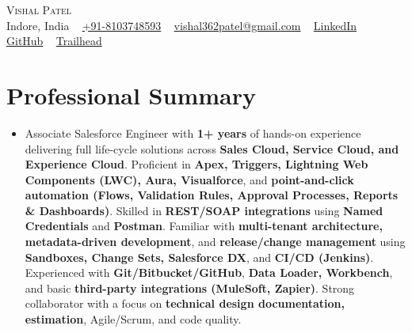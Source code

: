 \documentclass[letterpaper,10pt]{article}
\begin{document}
\begin{center}
    {\LARGE \scshape Vishal Patel} \\ \vspace{1pt}
    Indore, India ~
    \href{tel:+918103748593}{+91-8103748593} ~
    \href{mailto:vishal362patel@gmail.com}{vishal362patel@gmail.com} ~
    \href{https://www.linkedin.com/in/vishalpatel362}{LinkedIn} ~
    \href{https://github.com/vishal362patel}{GitHub} ~
    \href{https://trailblazer.me/id/vishal362patel}{Trailhead}
\end{center}

\section{Professional Summary}
\begin{itemize}[leftmargin=0.15in,label={},topsep=0pt,noitemsep]
    \item Associate Salesforce Engineer with \textbf{1+ years} of hands-on experience delivering full life-cycle solutions across \textbf{Sales Cloud, Service Cloud, and Experience Cloud}. Proficient in \textbf{Apex, Triggers, Lightning Web Components (LWC), Aura, Visualforce}, and \textbf{point-and-click automation (Flows, Validation Rules, Approval Processes, Reports \& Dashboards)}. Skilled in \textbf{REST/SOAP integrations} using \textbf{Named Credentials} and \textbf{Postman}. Familiar with \textbf{multi-tenant architecture, metadata-driven development}, and \textbf{release/change management} using \textbf{Sandboxes, Change Sets, Salesforce DX}, and \textbf{CI/CD (Jenkins)}. Experienced with \textbf{Git/Bitbucket/GitHub}, \textbf{Data Loader, Workbench}, and basic \textbf{third-party integrations (MuleSoft, Zapier)}. Strong collaborator with a focus on \textbf{technical design documentation, estimation}, Agile/Scrum, and code quality.
\end{itemize}

\end{document}
